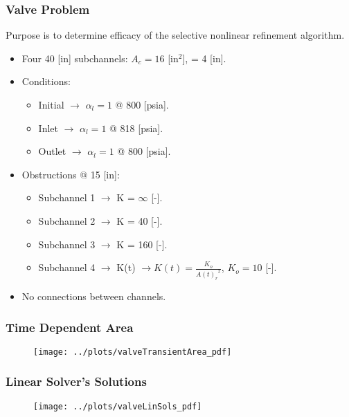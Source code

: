 \documentclass[compress,xcolor=table]{beamer}
\begin{document}
\begin{frame}
\frametitle{Valve Problem}

Purpose is to determine efficacy of the selective nonlinear refinement algorithm.

\begin{itemize}
\item{Four 40 [in] subchannels: $A_{c} = 16$ [in$^{2}$], \dx{} = 4 [in].}
\item{Conditions:
	\begin{itemize}
	\item{Initial $\rightarrow$ $\alpha_{l} = 1$ @ 800 [psia].}
	\item{Inlet $\rightarrow$ $\alpha_{l} = 1$ @ 818 [psia].}
	\item{Outlet $\rightarrow$ $\alpha_{l} = 1$ @ 800 [psia].}
	\end{itemize}
}
\item{Obstructions @ 15 [in]:
\begin{itemize}
	\item{Subchannel 1 $\rightarrow$ K = $\infty$ [-].}
	\item{Subchannel 2 $\rightarrow$ K = 40 [-].}
	\item{Subchannel 3 $\rightarrow$ K = 160 [-].}
	\item{Subchannel 4 $\rightarrow$ K(t) $\rightarrow K(t) = \frac{K_{o}}{{A(t)_r}^2}$, $K_{o} = 10$ [-].}
\end{itemize}
}
\item{No connections between channels.}
\end{itemize}

\end{frame}
\begin{frame}
\frametitle{Time Dependent Area}

\begin{figure}[h!t]
\centering
\texttt{[image: ../plots/valveTransientArea\_pdf]}
\end{figure}

\end{frame}
\begin{frame}
\frametitle{Linear Solver's Solutions}

\begin{figure}[h!t]
\centering
\texttt{[image: ../plots/valveLinSols\_pdf]}
\end{figure}

\end{frame}
\end{document}
